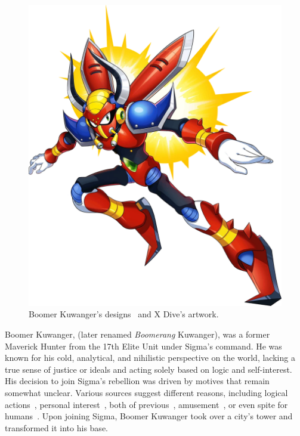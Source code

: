 \begin{figure}[htp]
	\includegraphics[height=\portraitsize]{figures/X1/Boomer_kuwanger/Boomer_Kuwanger.png}
	\caption{Boomer Kuwanger's designs~\cite{book:MMX_Complete_art} and X Dive's artwork.}
\end{figure}

Boomer Kuwanger, (later renamed \emph{Boomerang} Kuwanger), was a former Maverick Hunter from the 17th Elite Unit under Sigma's command. He was known for his cold, analytical, and nihilistic perspective on the world, lacking a true sense of justice or ideals and acting solely based on logic and self-interest. His decision to join Sigma's rebellion was driven by motives that remain somewhat unclear. Various sources suggest different reasons, including logical actions~\cite{MHX:manual}, personal interest~\cite{wiki:Boomer_kuwanger}, both of previous~\cite{book:MH_field_guide}, amusement~\cite{Xcoll1:Manual_X1}, or even spite for humans~\cite{wayback:X_resources}. Upon joining Sigma, Boomer Kuwanger took over a city's tower and transformed it into his base.


